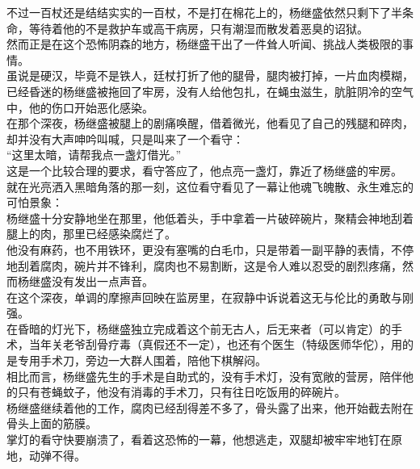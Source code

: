 \begin{multicols}{\theparacolNo}
不过一百杖还是结结实实的一百杖，不是打在棉花上的，杨继盛依然只剩下了半条命，等待着他的不是救护车或高干病房，只有潮湿而散发着恶臭的诏狱。\\

然而正是在这个恐怖阴森的地方，杨继盛干出了一件耸人听闻、挑战人类极限的事情。\\

虽说是硬汉，毕竟不是铁人，廷杖打折了他的腿骨，腿肉被打掉，一片血肉模糊，已经昏迷的杨继盛被拖回了牢房，没有人给他包扎，在蝇虫滋生，肮脏阴冷的空气中，他的伤口开始恶化感染。\\

在那个深夜，杨继盛被腿上的剧痛唤醒，借着微光，他看见了自己的残腿和碎肉，却并没有大声呻吟叫喊，只是叫来了一个看守：\\

“这里太暗，请帮我点一盏灯借光。”\\

这是一个比较合理的要求，看守答应了，他点亮一盏灯，靠近了杨继盛的牢房。\\

就在光亮洒入黑暗角落的那一刻，这位看守看见了一幕让他魂飞魄散、永生难忘的可怕景象：\\

杨继盛十分安静地坐在那里，他低着头，手中拿着一片破碎碗片，聚精会神地刮着腿上的肉，那里已经感染腐烂了。\\

他没有麻药，也不用铁环，更没有塞嘴的白毛巾，只是带着一副平静的表情，不停地刮着腐肉，碗片并不锋利，腐肉也不易割断，这是令人难以忍受的剧烈疼痛，然而杨继盛没有发出一点声音。\\

在这个深夜，单调的摩擦声回映在监房里，在寂静中诉说着这无与伦比的勇敢与刚强。\\

在昏暗的灯光下，杨继盛独立完成着这个前无古人，后无来者（可以肯定）的手术，当年关老爷刮骨疗毒（真假还不一定），也还有个医生（特级医师华佗），用的是专用手术刀，旁边一大群人围着，陪他下棋解闷。\\

相比而言，杨继盛先生的手术是自助式的，没有手术灯，没有宽敞的营房，陪伴他的只有苍蝇蚊子，他没有消毒的手术刀，只有往日吃饭用的碎碗片。\\

杨继盛继续着他的工作，腐肉已经刮得差不多了，骨头露了出来，他开始截去附在骨头上面的筋膜。\\

掌灯的看守快要崩溃了，看着这恐怖的一幕，他想逃走，双腿却被牢牢地钉在原地，动弹不得。\\


\end{multicols}
